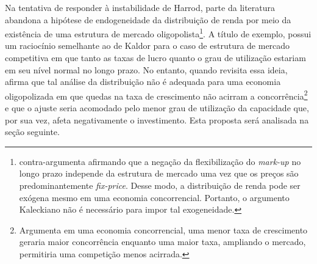 Na tentativa de responder à instabilidade de Harrod, parte da literatura abandona a hipótese de endogeneidade da distribuição de renda por meio da existência de uma estrutura de mercado oligopolista\footnote{\textcite{serrano_sraffian_1995} contra-argumenta afirmando que a negação da flexibilização do \textit{mark-up} no longo prazo independe da estrutura de mercado uma vez que os preços são predominantemente \textit{fix-price}. Desse modo, a distribuição de renda pode ser exógena mesmo em uma economia concorrencial. Portanto, o argumento Kaleckiano não é necessário para impor tal exogeneidade.}. A título de exemplo, \textcite{steindl_maturity_1952} possui um raciocínio semelhante ao de Kaldor para o caso de estrutura de mercado competitiva em que tanto as taxas de lucro quanto o grau de utilização estariam em seu nível normal no longo prazo. No entanto, quando revisita essa ideia, afirma que tal análise da distribuição não é adequada para uma economia oligopolizada  em que quedas na taxa de crescimento não acirram a concorrência\footnote{Argumenta em uma economia concorrencial, uma menor taxa de crescimento geraria maior concorrência enquanto uma maior taxa, ampliando o mercado, permitiria uma competição menos acirrada.} e que o ajuste seria acomodado pelo menor grau de utilização da capacidade que, por sua vez, afeta negativamente o investimento. Esta proposta será analisada na seção seguinte.



